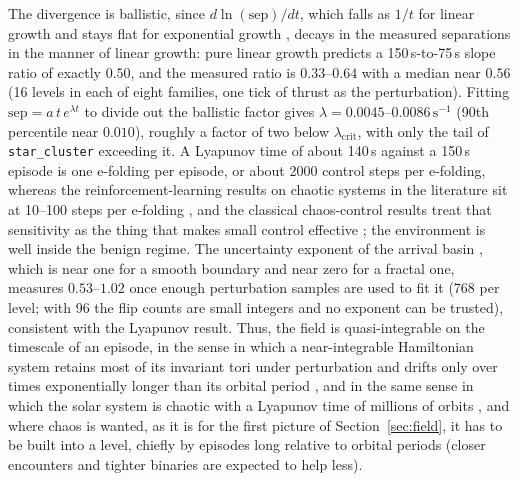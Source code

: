 \documentclass[11pt]{article}
\newcommand{\code}[1]{\texttt{\small #1}}
\begin{document}
The divergence is ballistic, since $d\ln(\mathrm{sep})/dt$, which falls as
$1/t$ for linear growth and stays flat for exponential growth
\cite{benettin1980,ott2002}, decays in the measured separations in the
manner of linear growth: pure linear growth predicts a 150\,s-to-75\,s slope
ratio of exactly $0.50$, and the measured ratio is $0.33$--$0.64$ with a
median near $0.56$ (16 levels in each of eight families, one tick of thrust
as the perturbation). Fitting $\mathrm{sep} = a\,t\,e^{\lambda t}$ to divide
out the ballistic factor gives $\lambda = 0.0045$--$0.0086\,\mathrm{s}^{-1}$
(90th percentile near $0.010$), roughly a factor of two below
$\lambda_{\mathrm{crit}}$, with only the tail of \code{star\_cluster}
exceeding it. A Lyapunov time of about 140\,s against a 150\,s episode is one
e-folding per episode, or about 2000 control steps per e-folding, whereas
the reinforcement-learning results on chaotic systems in the literature sit
at 10--100 steps per e-folding \cite{bucci2019,rabault2019,vignon2023}, and
the classical chaos-control results treat that sensitivity as the thing that
makes small control effective \cite{ott1990,shinbrot1990}; the environment
is well inside the benign regime. The uncertainty exponent of the arrival
basin \cite{grebogi1983,mcdonald1985,aguirre2009}, which is near one for a
smooth boundary and near zero for a fractal one, measures $0.53$--$1.02$
once enough perturbation samples are used to fit it (768 per level; with 96
the flip counts are small integers and no exponent can be trusted),
consistent with the Lyapunov result. Thus, the field is quasi-integrable on
the timescale of an episode, in the sense in which a near-integrable
Hamiltonian system retains most of its invariant tori under perturbation and
drifts only over times exponentially longer than its orbital period
\cite{kolmogorov1954,arnold1963,nekhoroshev1977}, and in the same sense in
which the solar system is chaotic with a Lyapunov time of millions of orbits
\cite{laskar1989,sussman1992}, and where chaos is wanted, as it is for the
first picture of Section~\ref{sec:field}, it has to be built into a
level, chiefly by episodes long relative to orbital periods (closer
encounters and tighter binaries are expected to help less).
\end{document}
